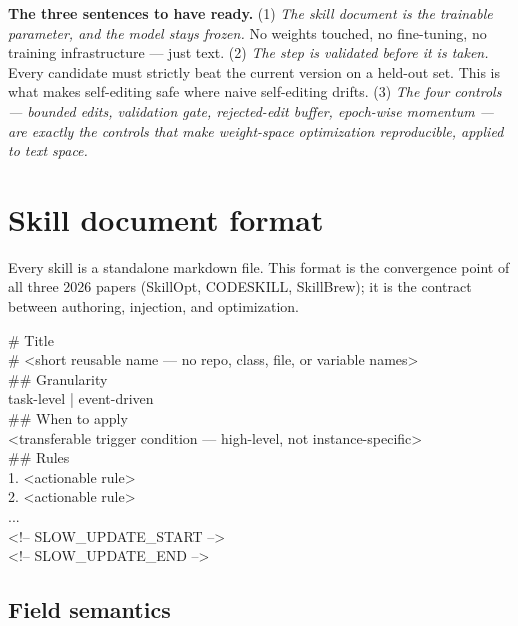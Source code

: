 \documentclass[11pt,a4paper]{article}
\begin{document}
\begin{keybox}
\textbf{The three sentences to have ready.}
(1) \emph{The skill document is the trainable parameter, and the model
stays frozen.} No weights touched, no fine-tuning, no training
infrastructure --- just text.
(2) \emph{The step is validated before it is taken.} Every candidate
must strictly beat the current version on a held-out set. This is what
makes self-editing safe where naive self-editing drifts.
(3) \emph{The four controls --- bounded edits, validation gate,
rejected-edit buffer, epoch-wise momentum --- are exactly the controls
that make weight-space optimization reproducible, applied to text
space.}
\end{keybox}

\section{Skill document format}
\label{sec:format}

Every skill is a standalone markdown file. This format is the
convergence point of all three 2026 papers (SkillOpt, CODESKILL,
SkillBrew); it is the contract between authoring, injection, and
optimization.

\begin{promptbox}
\# Title\\
\# <short reusable name --- no repo, class, file, or variable names>\\[0.4em]
\#\# Granularity\\
task-level | event-driven\\[0.4em]
\#\# When to apply\\
<transferable trigger condition --- high-level, not instance-specific>\\[0.4em]
\#\# Rules\\
1. <actionable rule>\\
2. <actionable rule>\\
...\\[0.4em]
<!-- SLOW\_UPDATE\_START -->\\
<!-- SLOW\_UPDATE\_END -->
\end{promptbox}

\subsection{Field semantics}
\end{document}
